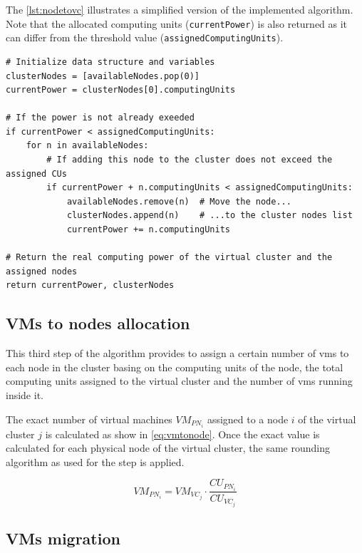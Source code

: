 The \autoref{lst:nodetovc} illustrates a simplified version of the implemented algorithm. Note that the allocated computing units (\texttt{currentPower}) is also returned as it can differ from the threshold value (\texttt{assignedComputingUnits}).

\lstset{language=python,caption=Nodes to virtual cluster allocation,label=lst:nodetovc}
\begin{lstlisting}
# Initialize data structure and variables
clusterNodes = [availableNodes.pop(0)]
currentPower = clusterNodes[0].computingUnits

# If the power is not already exeeded
if currentPower < assignedComputingUnits:
	for n in availableNodes:
		# If adding this node to the cluster does not exceed the assigned CUs
		if currentPower + n.computingUnits < assignedComputingUnits:
			availableNodes.remove(n)  # Move the node...
			clusterNodes.append(n)    # ...to the cluster nodes list
			currentPower += n.computingUnits

# Return the real computing power of the virtual cluster and the assigned nodes
return currentPower, clusterNodes
\end{lstlisting}

\subsection{VMs to nodes allocation}

This third step of the algorithm provides to assign a certain number of \glspl{vm} to each node in the cluster basing on the computing units of the node, the total computing units assigned to the virtual cluster and the number of \glspl{vm} running inside it.

The exact number of virtual machines $VM_{PN_i}$ assigned to a node $i$ of the virtual cluster $j$ is calculated as show in \autoref{eq:vmtonode}. Once the exact value is calculated for each physical node of the virtual cluster, the same rounding algorithm as used for the \emph{} step is applied.

\begin{equation}
	\label{eq:vmtonode}
	VM_{PN_i} = VM_{VC_j} \cdot \frac{CU_{PN_i}}{CU_{VC_j}}
\end{equation}

\subsection{VMs migration}

